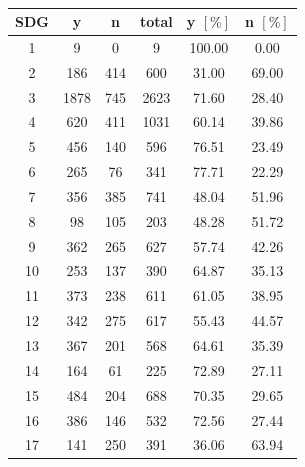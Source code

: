 \documentclass{article}
\begin{document}
\begin{table}[H]
\centering 
 \begin{tabular}{cccccc}
 \toprule
 SDG & y & n & total & y $[\%]$ & n $[\%]$ \\
 \hline
 1 & 9 & 0 & 9 & 100.00 & 0.00 \\
 2 & 186 & 414 & 600 & 31.00 & 69.00 \\
 3 & 1878 & 745 & 2623 & 71.60 & 28.40 \\
 4 & 620 & 411 & 1031 & 60.14 & 39.86 \\
 5 & 456 & 140 & 596 & 76.51 & 23.49 \\
 6 & 265 & 76 & 341 & 77.71 & 22.29 \\
 7 & 356 & 385 & 741 & 48.04 & 51.96 \\
 8 & 98 & 105 & 203 & 48.28 & 51.72 \\
 9 & 362 & 265 & 627 & 57.74 & 42.26 \\
 10 & 253 & 137 & 390 & 64.87 & 35.13 \\
 11 & 373 & 238 & 611 & 61.05 & 38.95 \\
 12 & 342 & 275 & 617 & 55.43 & 44.57 \\
 13 & 367 & 201 & 568 & 64.61 & 35.39 \\
 14 & 164 & 61 & 225 & 72.89 & 27.11 \\
 15 & 484 & 204 & 688 & 70.35 & 29.65 \\
 16 & 386 & 146 & 532 & 72.56 & 27.44 \\
 17 & 141 & 250 & 391 & 36.06 & 63.94 \\
 \bottomrule
\end{tabular}
\caption{}
\label{precisionv4survold}
\end{table}
\end{document}
